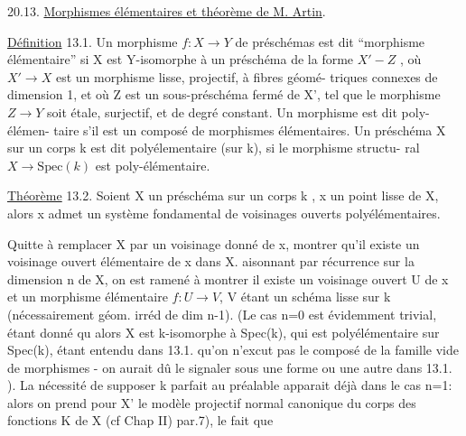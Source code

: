 
20.13. \uline{Morphismes élémentaires et théorème de M. Artin}.

\uline{Définition} 13.1. Un morphisme $f:X\to Y$ de préschémas est dit ``morphisme
 élémentaire'' si X est  Y-isomorphe à un préschéma de la forme
$X' - Z$ , où $X'\to X$ est un morphisme lisse, projectif, à fibres géomé-%
triques connexes\xout{\unsure{,}} de dimension 1, et où Z est un sous-préschéma fermé
de X',  tel que le morphisme $Z\to Y$ soit étale, surjectif, et
de degré constant. Un morphisme est dit  poly-élémen-%
taire s'il est un composé de morphismes élémentaires. Un préschéma X
sur un corps k est dit polyélementaire (sur k), si le morphisme structu-%
ral $X\to \mathrm{Spec}(k)$ est poly-élémentaire.

\uline{Théorème} 13.2.  Soient X un préschéma  sur un corps k , x un point lisse
de X, alors x admet un système fondamental de voisinages ouverts
polyélémentaires.

Quitte à remplacer X par un voisinage donné de x,  
  montrer qu'il existe un voisinage ouvert élémentaire de x dans X.
  aisonnant par récurrence sur
la dimension n de X, on  est ramené à montrer  il existe
un voisinage ouvert U de x et un morphisme élémentaire $f: U\to V$,
V étant un schéma lisse sur k (nécessairement géom. irréd  de dim n-1).
 (Le cas n=0 est évidemment trivial, étant donné qu alors
X est k-isomorphe à Spec(k), qui est polyélémentaire sur Spec(k), étant
entendu dans 13.1. qu'on n'excut pas le composé de la famille vide de
morphismes - on aurait dû le signaler sous une forme ou une autre dans
13.1. ). La nécessité de supposer k parfait au préalable apparait déjà
dans le cas n=1: alors on prend pour X' le modèle projectif normal
canonique du corps des fonctions K de X (cf Chap II) par.7), le fait que

